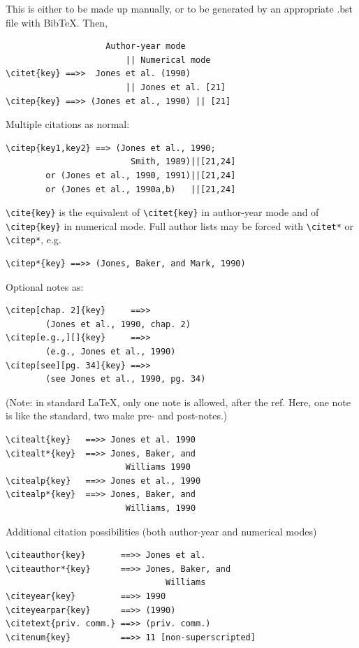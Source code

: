 \documentclass[unnumsec,webpdf,contemporary,large]{oup-authoring-template}%
\theoremstyle{thmstyleone}%
\theoremstyle{thmstyletwo}%
\theoremstyle{thmstylethree}%
\begin{document}
This is either to be made up manually, or to be generated by an
appropriate .bst file with BibTeX. Then,


{%
\begin{verbatim}
                    Author-year mode
                        || Numerical mode
\citet{key} ==>>  Jones et al. (1990)
                        || Jones et al. [21]
\citep{key} ==>> (Jones et al., 1990) || [21]
\end{verbatim}}


\noindent
Multiple citations as normal:


{%
\begin{verbatim}
\citep{key1,key2} ==> (Jones et al., 1990;
                         Smith, 1989)||[21,24]
        or (Jones et al., 1990, 1991)||[21,24]
        or (Jones et al., 1990a,b)   ||[21,24]
\end{verbatim}}


\noindent
\verb+\cite{key}+ is the equivalent of \verb+\citet{key}+ in author-year mode
and  of \verb+\citep{key}+ in numerical mode. Full author lists may be forced with
\verb+\citet*+ or \verb+\citep*+, e.g.


{%
\begin{verbatim}
\citep*{key} ==>> (Jones, Baker, and Mark, 1990)
\end{verbatim}}


\noindent
Optional notes as:


{%
\begin{verbatim}
\citep[chap. 2]{key}     ==>>
        (Jones et al., 1990, chap. 2)
\citep[e.g.,][]{key}     ==>>
        (e.g., Jones et al., 1990)
\citep[see][pg. 34]{key} ==>>
        (see Jones et al., 1990, pg. 34)
\end{verbatim}}


\noindent
(Note: in standard LaTeX, only one note is allowed, after the ref.
Here, one note is like the standard, two make pre- and post-notes.)


{%
\begin{verbatim}
\citealt{key}   ==>> Jones et al. 1990
\citealt*{key}  ==>> Jones, Baker, and
                        Williams 1990
\citealp{key}   ==>> Jones et al., 1990
\citealp*{key}  ==>> Jones, Baker, and
                        Williams, 1990
\end{verbatim}}


\noindent
Additional citation possibilities (both author-year and numerical modes)


{%
\begin{verbatim}
\citeauthor{key}       ==>> Jones et al.
\citeauthor*{key}      ==>> Jones, Baker, and
                                Williams
\citeyear{key}         ==>> 1990
\citeyearpar{key}      ==>> (1990)
\citetext{priv. comm.} ==>> (priv. comm.)
\citenum{key}          ==>> 11 [non-superscripted]
\end{verbatim}}
\end{document}

